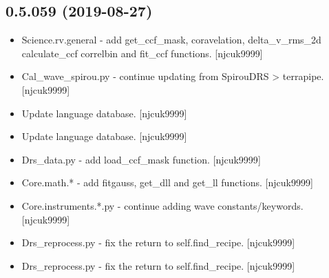 \documentclass[a4paper,10pt,english]{report}
\begin{document}
\subsection{0.5.059 (2019-08-27)}
\label{\detokenize{misc/changelog:id82}}\begin{itemize}
\item {} 
Science.rv.general - add get\_ccf\_mask, coravelation, delta\_v\_rms\_2d
calculate\_ccf correlbin and fit\_ccf functions. {[}njcuk9999{]}

\item {} 
Cal\_wave\_spirou.py - continue updating from SpirouDRS \textendash{}\textgreater{} terrapipe.
{[}njcuk9999{]}

\item {} 
Update language database. {[}njcuk9999{]}

\item {} 
Update language database. {[}njcuk9999{]}

\item {} 
Drs\_data.py - add load\_ccf\_mask function. {[}njcuk9999{]}

\item {} 
Core.math.* - add fitgauss, get\_dll and get\_ll functions. {[}njcuk9999{]}

\item {} 
Core.instruments.*.py - continue adding wave constants/keywords.
{[}njcuk9999{]}

\item {} 
Drs\_reprocess.py - fix the return to self.find\_recipe. {[}njcuk9999{]}

\item {} 
Drs\_reprocess.py - fix the return to self.find\_recipe. {[}njcuk9999{]}

\end{itemize}
\end{document}
